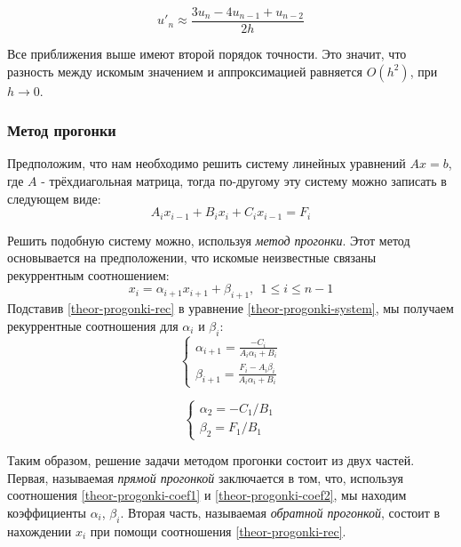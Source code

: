 \documentclass[12pt]{article}%
\begin{document}
\begin{equation}\label{theor-d1-upper-bound}
    u'_{n} \approx \frac{3 u_n - 4u_{n-1} + u_{n-2}}{2h}
\end{equation}

Все приближения выше имеют второй порядок точности. Это значит, что разность между искомым значением и аппроксимацией равняется $O(h^2)$, при $h \rightarrow 0$.

\subsubsection{Метод прогонки}
Предположим, что нам необходимо решить систему линейных уравнений $Ax=b$, где $A$ - трёхдиагольная матрица, тогда по-другому эту систему можно записать в следующем виде:
\begin{equation}\label{theor-progonki-system}
    A_i x_{i - 1} + B_i x_{i} + C_i x_{i-1} = F_i
\end{equation}

Решить подобную систему можно, используя \textit{метод прогонки}. Этот метод основывается на предположении, что искомые неизвестные связаны рекуррентным соотношением:
\begin{equation}\label{theor-progonki-rec}
    x_{i} = \alpha_{i + 1} x_{i + 1} + \beta_{i + 1},\ \ 1 \le i \le n-1
\end{equation}
Подставив \ref{theor-progonki-rec} в уравнение \ref{theor-progonki-system}, мы получаем рекуррентные соотношения для $\alpha_{i}$ и $\beta_{i}$:
\begin{equation}\label{theor-progonki-coef1}
\begin{cases}
    \alpha_{i + 1} = \frac{-C_i}{A_i \alpha_i + B_i} \\
    \beta_{i + 1} = \frac{F_i - A_i \beta_i}{A_i \alpha_i + B_i}
\end{cases}
\end{equation}

\begin{equation}\label{theor-progonki-coef2}
\begin{cases}
    \alpha_2 = -C_1 / B_1 \\
    \beta_2 = F_1 / B_1
\end{cases}
\end{equation}

Таким образом, решение задачи методом прогонки состоит из двух частей. Первая, называемая \textit{прямой прогонкой} заключается в том, что, используя соотношения \ref{theor-progonki-coef1} и \ref{theor-progonki-coef2}, мы находим коэффициенты $\alpha_i$, $\beta_i$. Вторая часть, называемая \textit{обратной прогонкой}, состоит в нахождении $x_i$ при помощи соотношения \ref{theor-progonki-rec}.
\end{document}

